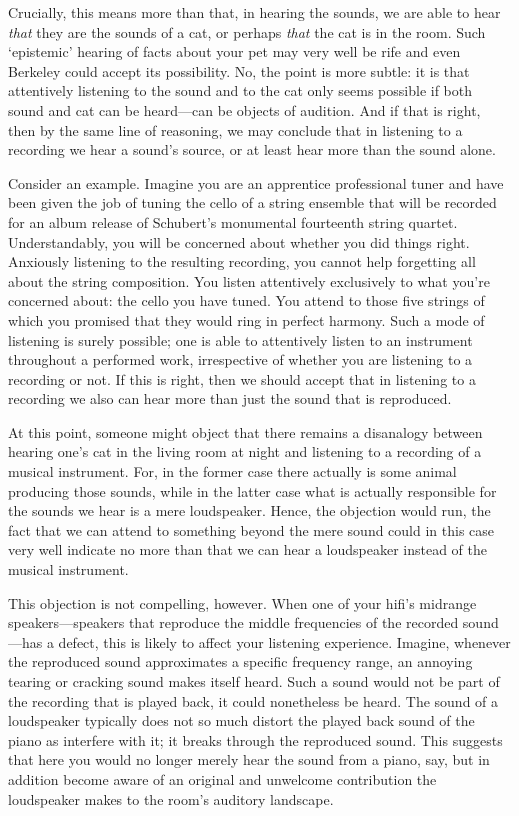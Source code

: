 \documentclass[sloppy, journal, git, bytitle, dodraft]{humapap}
\begin{document}
Crucially, this means more than that, in hearing the sounds, we are able to hear \emph{that} they are the sounds of a cat, or perhaps \emph{that} the cat is in the room. Such `epistemic' hearing of facts about your pet may very well be rife and even Berkeley could accept its possibility. No, the point is more subtle: it is that attentively listening to the sound and to the cat only seems possible if both sound and cat can be heard---can be objects of audition. And if that is right, then by the same line of reasoning, we may conclude that in listening to a recording we hear a sound's source, or at least hear more than the sound alone.

Consider an example. Imagine you are an apprentice professional tuner and have been given the job of tuning the cello of a string ensemble that will be recorded for an album release of Schubert's monumental fourteenth string quartet. Understandably, you will be concerned about whether you did things right. Anxiously listening to the resulting recording, you cannot help forgetting all about the string composition. You listen attentively exclusively to what you're concerned about: the cello you have tuned. You attend to those five strings of which you promised that they would ring in perfect harmony. Such a mode of listening is surely possible; one is able to attentively listen to an instrument throughout a performed work, irrespective of whether you are listening to a recording or not. If this is right, then we should accept that in listening to a recording we also can hear more than just the sound that is reproduced.

At this point, someone might object that there remains a disanalogy between hearing one's cat in the living room at night and listening to a recording of a musical instrument. For, in the former case there actually is some animal producing those sounds, while in the latter case what is actually responsible for the sounds we hear is a mere loudspeaker. Hence, the objection would run, the fact that we can attend to something beyond the mere sound could in this case very well indicate no more than that we can hear a loudspeaker instead of the musical instrument. 

This objection is not compelling, however. When one of your hifi's midrange speakers---speakers that reproduce the middle frequencies of the recorded sound---has a defect, this is likely to affect your listening experience. Imagine, whenever the reproduced sound approximates a specific frequency range, an annoying tearing or cracking sound makes itself heard. Such a sound would not be part of the recording that is played back, it could nonetheless be heard. The sound of a loudspeaker typically does not so much distort the played back sound of the piano as interfere with it; it breaks through the reproduced sound. This suggests that here you would no longer merely hear the sound from a piano, say, but in addition become aware of an original and unwelcome contribution the loudspeaker makes to the room's auditory landscape. 
\end{document}
